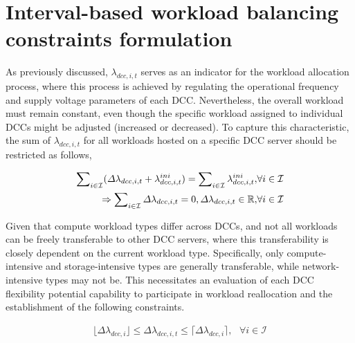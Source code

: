 \documentclass[lettersize,journal]{IEEEtran}
\begin{document}
\section{Interval-based workload balancing constraints formulation}

As previously discussed, \(\lambda_{dcc,i,t} \) serves as an indicator for the workload allocation process, where this process is achieved by regulating the operational frequency and supply voltage parameters of each DCC. Nevertheless, the overall workload must remain constant, even though the specific workload assigned to individual DCCs might be adjusted (increased or decreased). To capture this characteristic, the sum of \(\lambda_{dcc,i,t}\) for all workloads hosted on a specific DCC server should be restricted as follows,

\vspace{-0.25cm}
\begin{subequations}
	\begin{align}
		\sum\nolimits_{i\in\mathcal{I}} (\varDelta \lambda_{dcc,i,t} + \lambda_{dcc,i,t}^{ini} ) = \sum\nolimits_{i\in\mathcal{I}} \lambda_{dcc,i,t}^{ini}, & \forall i\in\mathcal{I} \notag \\
		\Rightarrow \sum\nolimits_{i\in\mathcal{I}} \varDelta \lambda_{dcc,i,t} = 0,\varDelta \lambda_{dcc,i,t} \in\mathbb{R},                              & \forall i\in\mathcal{I}
	\end{align}
\end{subequations}

Given that compute workload types differ across DCCs, and not all workloads can be freely transferable to other DCC servers, where this transferability is closely dependent on the current workload type. Specifically, only compute-intensive and storage-intensive types are generally transferable, while network-intensive types may not be. This necessitates an evaluation of each DCC flexibility potential capability to participate in workload reallocation and the establishment of the following constraints.

\vspace{-0.25cm}
\begin{subequations}
	\begin{align}
		\lfloor \varDelta \lambda_{dcc,i} \rfloor \leq \varDelta \lambda_{dcc,i,t} \leq \lceil\varDelta \lambda_{dcc,i} \rceil, \,\,\,\, \forall i\in\mathcal{I}
	\end{align}
\end{subequations}
\end{document}
